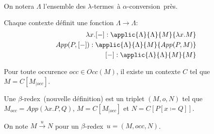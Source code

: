 \documentclass[math, info]{cours}
\def\lambdatermes{$\lambda$-termes\ }
\def\walrus{\coloneqq}
\newcommand{\sub}[3]{#1\left[#2\walrus #3\right]}
\def\alphaconv{$\alpha$-conversion\ }
\def\betaredex{$\beta$-redex\ }
\begin{document}
\begin{definition}
	On notera $\Lambda$ l'ensemble des \lambdatermes à \alphaconv près.
	\label{def:classequivlambda}
\end{definition}

\begin{remarque}
	Chaque contexte définit une fonction $\Lambda \to \Lambda$:
	\begin{align*}
		\lambda x. [-]: \applic{\Lambda}{\Lambda}{M}{\lambda x. M} \\
		App(P, [-]): \applic{\Lambda}{\Lambda}{M}{App(P, M)}       \\
		[-]: \applic{\Lambda}{\Lambda}{M}{M}
	\end{align*}
\end{remarque}

\begin{proposition}
	Pour toute occurence $occ \in Occ(M)$, il existe un contexte $C$ tel que $M = C[M_{\mid occ}]$.
	\label{prop:occcontexte}
\end{proposition}

\begin{definition}
	Une \betaredex (nouvelle définition) est un triplet $(M, o, N)$ tel que $M_{occ} = App\left(\lambda x. P, Q \right)$, $M = C[M_{\mid occ}]$ et $N = C[\sub{P}{x}{Q}]$.
	\label{def:betaredex2}
\end{definition}

\begin{vocabulary}
	On note $M \xrightarrow{u} N$ pour un \betaredex $u = \left(M, occ, N\right)$.
\end{vocabulary}
\end{document}
